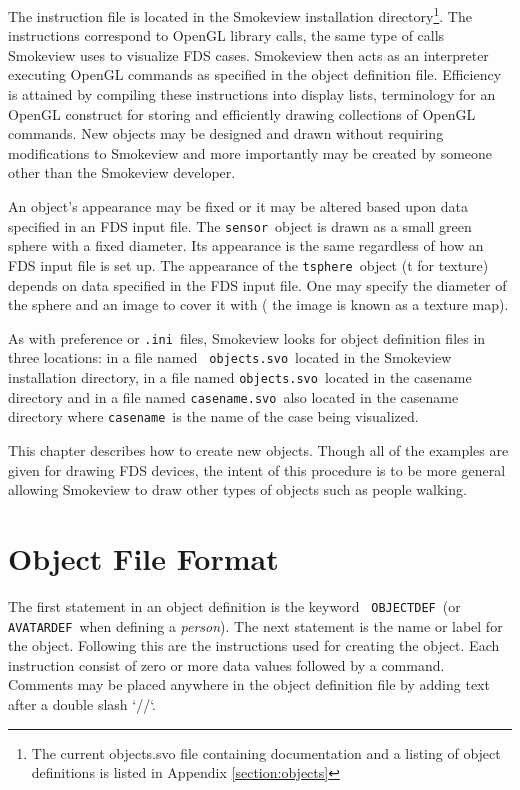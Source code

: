 \documentclass[11pt,twoside]{book}
\begin{document}
The instruction file is located in the  Smokeview installation
directory\footnote{The current objects.svo file containing
documentation and a listing of object definitions is listed in
Appendix \ref{section:objects}}. The instructions correspond to
OpenGL library calls, the same type of calls Smokeview uses to
visualize FDS cases. Smokeview then acts as an interpreter
executing OpenGL commands as specified in the object definition
file. Efficiency is attained by compiling these instructions into
display lists, terminology for an OpenGL construct for storing and
efficiently drawing collections of OpenGL commands.  New objects
may be designed and drawn without requiring modifications to
Smokeview and more importantly may be created by someone other
than the Smokeview developer.

An object's appearance may be fixed or it may be altered based
upon data specified in an FDS input file.  The {\tt sensor}\
object is drawn as a small green sphere with a fixed diameter.
Its appearance is the same regardless of how an FDS input file is
set up. The appearance of the {\tt tsphere}\ object (t for
texture) depends on data specified in the FDS input file.  One may
specify the diameter of the sphere and an image to cover it with (
the image is known as a texture map).

As with preference or {\tt .ini}\ files, Smokeview looks for
object definition files in three locations: in a file named {\tt
objects.svo}\ located in the Smokeview installation directory, in
a file named {\tt objects.svo}\ located in the casename directory
and in a file named {\tt casename.svo}\ also located in the
casename directory where {\tt casename}\ is the name of the case
being visualized.

This chapter describes how to create new objects. Though all of
the examples are given for drawing FDS devices, the intent of this
procedure is to be more general allowing Smokeview to draw other
types of objects such as people walking.

\section{Object File Format}
The first statement in an object definition is the keyword {\tt
OBJECTDEF}\ (or {\tt AVATARDEF}\ when defining a {\em person}). The
next statement is the name or label for the object. Following this
are the instructions used for creating the object. Each
instruction consist of zero or more data values followed by a
command. Comments may be placed anywhere in the object definition
file by adding text after a double slash `//`.
\end{document}
